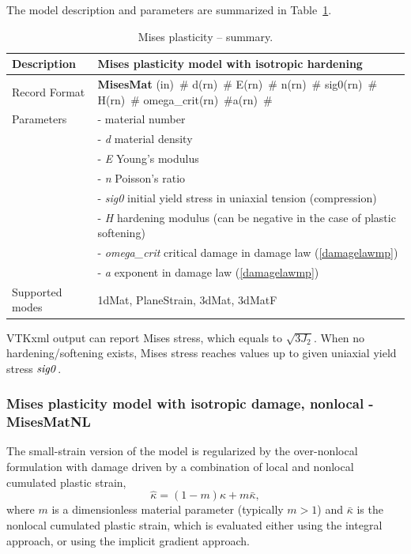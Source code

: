 \documentclass[a4paper]{article}
\newcommand{\descitem}[1]{{\noindent \bf #1}}
\newcommand{\elemparam}[2]{{{#1\tiny (#2)}~\#}}
\newcommand{\param}[1]{{\it #1}}
\begin{document}
The model description and parameters are summarized in Table~\ref{misesMat_table}.
\begin{table}[!htb]
\begin{tabular}{|l|p{9cm}|}
\hline
Description & Mises plasticity model with isotropic hardening\\
\hline
Record Format & \descitem{MisesMat}  \elemparam{}{in}
\elemparam{d}{rn} \elemparam{E}{rn} \elemparam{n}{rn} \elemparam{sig0}{rn} \elemparam{H}{rn} \elemparam{omega\_crit}{rn}\elemparam{a}{rn}\\
Parameters &- \param{} material number\\
&- \param{d} material density\\
&- \param{E} Young's modulus\\
&- \param{n} Poisson's ratio\\
&- \param{sig0} initial yield stress in uniaxial tension (compression)\\
&- \param{H} hardening modulus (can be negative in the case of plastic softening)\\
&- \param{omega\_crit} critical damage in damage law (\ref{damagelawmp})\\
&- \param{a} exponent in damage law (\ref{damagelawmp})\\
Supported modes& 1dMat, PlaneStrain, 3dMat, 3dMatF\\
\hline
\end{tabular}
\caption{Mises plasticity -- summary.}
\label{misesMat_table}
\end{table}

VTKxml output can report Mises stress, which equals to $\sqrt{3J_2}$. When no hardening/softening exists, Mises stress reaches values up to given uniaxial yield stress $\param{sig0}$. 

\subsubsection{Mises plasticity model with isotropic damage, nonlocal - MisesMatNL}
The small-strain version of the model is regularized by the over-nonlocal formulation with damage driven by a combination of local and nonlocal cumulated plastic strain,
\begin{equation}\label{overKappa1}
\hat{\kappa} = (1-m)\kappa + m\bar{\kappa},
\end{equation}
where $m$ is a dimensionless material parameter (typically $m>1$) and $\bar{\kappa}$ is the nonlocal cumulated plastic strain, which is evaluated either using the integral approach,
or using the implicit gradient approach.
\end{document}
